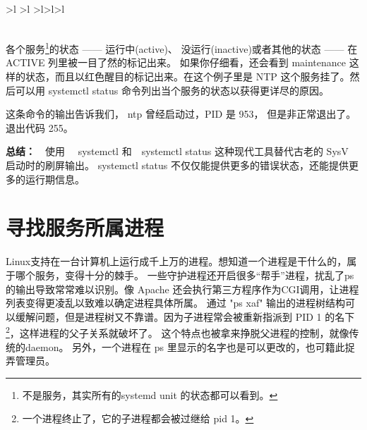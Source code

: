 \begin{tiny}
\begin{longtable}[h]{>\tiny l >\tiny l >\tiny l>\tiny l>\tiny l}
 \\
 \\
\end{longtable}
\end{tiny}

各个服务\footnote{不是服务，其实所有的systemd unit 的状态都可以看到。}的状态 —— 运行中(active)、 没运行(inactive)或者其他的状态 —— 在 ACTIVE 列里被一目了然的标记出来。
如果你仔细看，还会看到 maintenance 这样的状态，而且以红色醒目的标记出来。在这个例子里是 NTP 这个服务挂了。然后可以用 systemctl status 命令列出当个服务的状态以获得更详尽的原因。


这条命令的输出告诉我们， ntp 曾经启动过，PID 是  953， 但是非正常退出了。
退出代码 255。

\textbf{总结：}　使用　 systemctl 和　systemctl status 这种现代工具替代古老的 SysV 启动时的刷屏输出。
systemctl status 不仅仅能提供更多的错误状态，还能提供更多的运行期信息。

\section{寻找服务所属进程}

Linux支持在一台计算机上运行成千上万的进程。想知道一个进程是干什么的，属于哪个服务，变得十分的棘手。
一些守护进程还开启很多“帮手”进程，扰乱了ps的输出导致常常难以识别。像 Apache 还会执行第三方程序作为CGI调用，让进程列表变得更凌乱以致难以确定进程具体所属。
通过 "ps xaf" 输出的进程树结构可以缓解问题，但是进程树又不靠谱。因为子进程常会被重新指派到 PID 1 的名下\footnote{一个进程终止了，它的子进程都会被过继给 pid 1。}，这样进程的父子关系就破坏了。
这个特点也被拿来挣脱父进程的控制，就像传统的daemon。
另外，一个进程在 ps 里显示的名字也是可以更改的，也可籍此捉弄管理员。

